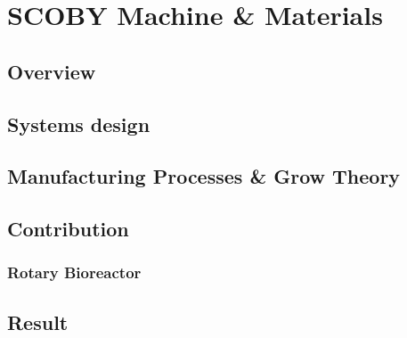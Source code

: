 \chapter{SCOBY Machine \& Materials}


\section{Overview}




\section{Systems design}
\section{Manufacturing Processes \& Grow Theory}

\section{Contribution}

\subsection{Rotary Bioreactor}


\section{Result}

